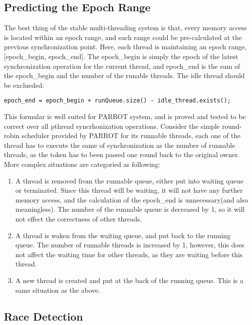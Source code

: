 \subsection{Predicting the Epoch Range}
The best thing of the stable multi-threading system is that, 
every memory access is located within an epoch range, and such range could be pre-calculated at the previous synchronization point.
Here, each thread is maintaining an epoch range, [epoch\_begin, epoch\_end]. 
The epoch\_begin is simply the epoch of the latest synchronization operation for the current thread,
and epoch\_end is the sum of the epoch\_begin and the number of the runable threads. The idle thread should be exclueded:
\begin{center}
\lstset{language=C++}
 \begin{lstlisting}
epoch_end = epoch_begin + runQueue.size() - idle_thread.exists();
 \end{lstlisting}
\end{center}
This formular is well suited for PARROT system, and is proved and tested to be correct over all pthread syncrhonization operations.
Consider the simple round-robin scheduler provided by PARROT for its runnable threads, each one of the thread has to execute the same of synchronization
as the number of runnable threads, as the token has to been passed one round back to the original owner. More complex situations are categoried as following:
\begin{enumerate}
 \item A thread is removed from the runnable queue, either put into waiting queue or terminated. 
 Since this thread will be waiting, it will not have any further memory access, and the calculation of the epoch\_end is unnecessary(and also meaningless).
 The number of the runnable queue is decreased by 1, so it will not effect the correctness of other threads.
 \item A thread is waken from the waiting queue, and put back to the running queue. The number of runnable threads is increased by 1, however, 
 this does not affect the waiting time for other threads, as they are waiting before this thread.
 \item A new thread is created and put at the back of the running queue. This is a same situation as the above.
\end{enumerate}

\subsection{Race Detection}
